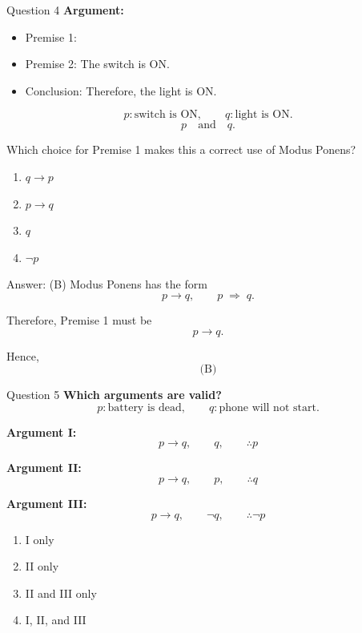 \documentclass[aspectratio=169,11pt]{beamer}
\begin{document}
\begin{frame}{Question 4}
\textbf{Argument:}

\begin{itemize}
    \item Premise 1: \hspace{1cm}
    \item Premise 2: The switch is ON.
    \item Conclusion: Therefore, the light is ON.
\end{itemize}

$$
p:\text{switch is ON},\qquad q:\text{light is ON}.
$$
$$
p\quad\text{and}\quad q.
$$

Which choice for Premise 1 makes this a correct use of Modus Ponens?

\begin{enumerate}
    \item[(A)] $q\to p$
    \item[(B)] $p\to q$
    \item[(C)] $q$
    \item[(D)] $\neg p$
\end{enumerate}
\end{frame}

\begin{frame}
\begin{block}{Answer: (B)}
Modus Ponens has the form
$$
p\to q,\qquad p
\;\Rightarrow\;
q.
$$

Therefore, Premise 1 must be
$$
p\to q.
$$

Hence,
$$
\boxed{\text{(B)}}
$$
\end{block}
\end{frame}


\begin{frame}{Question 5}
\textbf{Which arguments are valid?}
$$
p:\text{battery is dead},\qquad
q:\text{phone will not start}.
$$

\textbf{Argument I:}
$$
p\to q,\qquad q,\qquad\therefore p
$$

\textbf{Argument II:}
$$
p\to q,\qquad p,\qquad\therefore q
$$

\textbf{Argument III:}
$$
p\to q,\qquad \neg q,\qquad\therefore\neg p
$$

\begin{enumerate}
    \item[(A)] I only
    \item[(B)] II only
    \item[(C)] II and III only
    \item[(D)] I, II, and III
\end{enumerate}
\end{frame}
\end{document}
